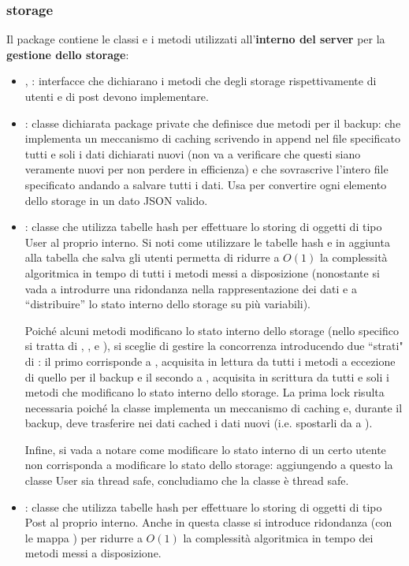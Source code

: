 \documentclass[11pt, italian, openany]{book}
\begin{document}
\begin{sloppypar}
\subsubsection*{storage}
Il package contiene le classi e i metodi utilizzati all'\textbf{interno del server} per la \textbf{gestione dello storage}:
\begin{itemize}[itemsep=0pt, parsep=0pt, topsep=0pt]
	\item {}, : interfacce che dichiarano i metodi che degli storage rispettivamente di utenti
	e di post devono implementare.
	\item {}: classe dichiarata package private che definisce due metodi per il backup:  che
	implementa un meccanismo di caching scrivendo in append nel file specificato tutti e soli i dati dichiarati nuovi (non va a verificare
	che questi siano veramente nuovi per non perdere in efficienza) e  che sovrascrive l'intero file specificato
	andando a salvare tutti i dati. Usa  per convertire ogni elemento dello storage in un dato JSON valido.
	\item {}: classe che utilizza tabelle hash per effettuare lo storing di oggetti di tipo User al proprio interno.
	Si noti come utilizzare le tabelle hash  e  in aggiunta alla tabella che salva gli utenti
	permetta di ridurre a \(O(1)\) la complessit\`a algoritmica in tempo di tutti i metodi messi a disposizione (nonostante si vada
	a introdurre una ridondanza nella rappresentazione dei dati e a ``distribuire'' lo stato interno dello storage su pi\`u variabili).

	Poich\'e alcuni metodi modificano lo stato interno dello storage (nello specifico si tratta di ,
	,  e ), si sceglie di gestire la concorrenza introducendo due
	``strati" di : il primo corrisponde a , acquisita in lettura da tutti
	i metodi a eccezione di quello per il backup e il secondo a , acquisita in scrittura da tutti e soli i metodi che
	modificano lo stato interno dello storage. La prima lock risulta necessaria poich\'e la classe implementa un meccanismo di caching e,
	durante il backup, deve trasferire nei dati cached i dati nuovi (i.e. spostarli da  a ).

	Infine, si vada a notare come modificare lo stato interno di un certo utente non corrisponda a modificare lo stato dello
	storage: aggiungendo a questo la classe User sia thread safe, concludiamo che la classe \`e thread safe.
	\item {}: classe che utilizza tabelle hash per effettuare lo storing di oggetti di tipo Post al proprio interno.
	Anche in questa classe si introduce ridondanza (con le mappa ) per ridurre a \(O(1)\) la complessit\`a algoritmica
	in tempo dei metodi messi a disposizione.


\end{itemize}
\end{sloppypar}
\end{document}
